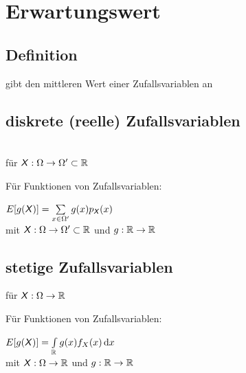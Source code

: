 \documentclass[german,color,6pt]{latex4ei/latex4ei_sheet}
\begin{document}
\section{Erwartungswert}
\begin{sectionbox}
	\subsection{Definition}
	gibt den mittleren Wert einer Zufallsvariablen an
\end{sectionbox}

\begin{sectionbox}
	\subsection{diskrete (reelle) Zufallsvariablen}
	 \\
	für $\operatorname{\textsf{\textit{X}}}: \Omega \rightarrow \Omega' \subset \mathbb R$ 
	
	Für Funktionen von Zufallsvariablen:
	
	$E[g(\operatorname{\textsf{\textit{X}}})] = \sum \limits_{x \in \Omega'} g(x) p_{\operatorname{\textsf{\textit{X}}}} (x)$\\
	mit $\operatorname{\textsf{\textit{X}}} : \Omega \rightarrow \Omega' \subset \mathbb R$ und $g: \mathbb R \rightarrow \mathbb R$
\end{sectionbox}

\begin{sectionbox}
	\subsection{stetige Zufallsvariablen}
	 für $\operatorname{\textsf{\textit{X}}} : \Omega \rightarrow \mathbb R$
	
	Für Funktionen von Zufallsvariablen:
	
	$E[g(\X)] = \int \limits_{\mathbb R} g(x) f_X (x) \diff x$\\
	mit $\operatorname{\textsf{\textit{X}}} : \Omega \rightarrow \mathbb R $ und $g: \mathbb R \rightarrow \mathbb R$
\end{sectionbox}
\end{document}
